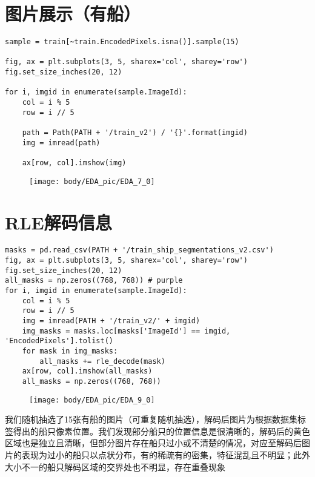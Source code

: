 \section{图片展示（有船）}\label{ux56feux7247ux5c55ux793aux6709ux8239}

\begin{lstlisting}
sample = train[~train.EncodedPixels.isna()].sample(15)

fig, ax = plt.subplots(3, 5, sharex='col', sharey='row')
fig.set_size_inches(20, 12)

for i, imgid in enumerate(sample.ImageId):
    col = i % 5
    row = i // 5
    
    path = Path(PATH + '/train_v2') / '{}'.format(imgid)
    img = imread(path)
    
    ax[row, col].imshow(img)
\end{lstlisting}

\begin{figure}[htbp]
\centering
\texttt{[image: body/EDA\_pic/EDA\_7\_0]}
\caption{}
\end{figure}

\section{RLE解码信息}\label{rleux89e3ux7801ux4fe1ux606f}

\begin{lstlisting}
masks = pd.read_csv(PATH + '/train_ship_segmentations_v2.csv')
fig, ax = plt.subplots(3, 5, sharex='col', sharey='row')
fig.set_size_inches(20, 12)
all_masks = np.zeros((768, 768)) # purple
for i, imgid in enumerate(sample.ImageId):
    col = i % 5
    row = i // 5
    img = imread(PATH + '/train_v2/' + imgid)
    img_masks = masks.loc[masks['ImageId'] == imgid, 'EncodedPixels'].tolist()
    for mask in img_masks:
        all_masks += rle_decode(mask)
    ax[row, col].imshow(all_masks)
    all_masks = np.zeros((768, 768))
\end{lstlisting}

\begin{figure}[htbp]
\centering
\texttt{[image: body/EDA\_pic/EDA\_9\_0]}
\caption{}
\end{figure}

我们随机抽选了15张有船的图片（可重复随机抽选），解码后图片为根据数据集标签得出的船只像素位置。我们发现部分船只的位置信息是很清晰的，解码后的黄色区域也是独立且清晰，但部分图片存在船只过小或不清楚的情况，对应至解码后图片的表现为过小的船只以点状分布，有的稀疏有的密集，特征混乱且不明显；此外大小不一的船只解码区域的交界处也不明显，存在重叠现象

